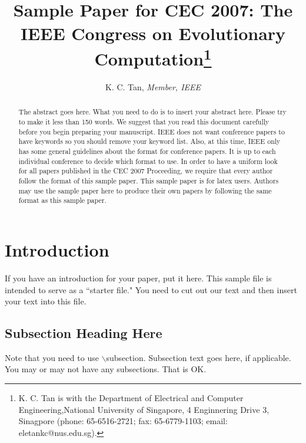 \documentclass[conference]{IEEEtran}
\begin{document}
\title{\ \\ \LARGE\bf Sample Paper for CEC 2007: The IEEE 
 Congress on Evolutionary Computation\thanks{K. C. Tan is with the
Department of Electrical and Computer Engineering,National University of Singapore, 4 Enginnering Drive 3, Sinagpore
(phone: 65-6516-2721; fax: 65-6779-1103; email: eletankc@nus.edu.sg).}
}

\author{K. C. Tan, {\it Member, IEEE}}

\maketitle

\begin{abstract}
The abstract goes here. What you need to do is to insert your abstract
here. Please try to make it less than 150 words. 
We suggest that you read this document carefully before you begin preparing
your manuscript. IEEE does not want conference papers to have 
keywords so you should remove your keyword list. 
Also, at this time, IEEE only has some general guidelines about the 
format for conference papers.
It is up to each individual conference to decide which format to use.
In order to have a uniform look for all papers published in the CEC 
2007 Proceeding, we require that every author follow the 
format of this sample paper.  This sample paper is for latex users. 
Authors may use the sample paper here to produce their own 
papers by following the same format as this sample paper.
\end{abstract}


\section{Introduction}

If you have an introduction for your paper, put it here.
This sample file is intended to serve as a ``starter file."
You need to cut out our text and then insert your text into this file.

\subsection{Subsection Heading Here}
Note that you need to use $\backslash$subsection.
Subsection text goes here, if applicable.
You may or may not have any subsections. That is OK.
\end{document}
